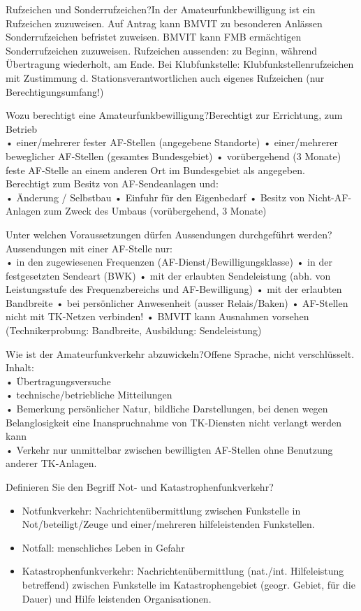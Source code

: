 \documentclass[avery5371,grid,frame,a4paper]{flashcards}
\newcommand{\card}[3]{
  \begin{flashcard}[{\chap} -- #1]{#2}#3\end{flashcard}
}
\begin{document}
\card{29}{Rufzeichen und Sonderrufzeichen?}{In der Amateurfunkbewilligung ist ein Rufzeichen zuzuweisen. Auf Antrag kann BMVIT zu besonderen Anlässen Sonderrufzeichen befristet zuweisen. BMVIT kann FMB ermächtigen Sonderrufzeichen zuzuweisen. Rufzeichen aussenden: zu Beginn, während Übertragung wiederholt, am Ende. Bei Klubfunkstelle: Klubfunkstellenrufzeichen mit Zustimmung d. Stationsverantwortlichen auch eigenes Rufzeichen (nur Berechtigungsumfang!)}

\card{30}{Wozu berechtigt eine Amateurfunkbewilligung?}{Berechtigt zur Errichtung, zum Betrieb \\
• einer/mehrerer fester AF-Stellen (angegebene Standorte)
• einer/mehrerer beweglicher AF-Stellen (gesamtes Bundesgebiet)
• vorübergehend (3 Monate) feste AF-Stelle an einem anderen Ort im Bundesgebiet als angegeben. \\
Berechtigt zum Besitz von AF-Sendeanlagen und: \\
• Änderung / Selbstbau
• Einfuhr für den Eigenbedarf
• Besitz von Nicht-AF-Anlagen zum Zweck des Umbaus (vorübergehend, 3 Monate)}

\card{31}{Unter welchen Voraussetzungen dürfen Aussendungen durchgeführt werden?}{Aussendungen mit einer AF-Stelle nur: \\
• in den zugewiesenen Frequenzen (AF-Dienst/Bewilligungsklasse)
• in der festgesetzten Sendeart (BWK)
• mit der erlaubten Sendeleistung (abh. von Leistungsstufe des Frequenzbereichs und AF-Bewilligung)
• mit der erlaubten Bandbreite
• bei persönlicher Anwesenheit (ausser Relais/Baken)
• AF-Stellen nicht mit TK-Netzen verbinden!
• BMVIT kann Ausnahmen vorsehen (Technikerprobung: Bandbreite, Ausbildung: Sendeleistung)}

\card{32}{Wie ist der Amateurfunkverkehr abzuwickeln?}{Offene Sprache, nicht verschlüsselt.
Inhalt:\\ • Übertragungsversuche \\ • technische/betriebliche Mitteilungen \\ • Bemerkung persönlicher Natur, bildliche Darstellungen, bei denen wegen Belanglosigkeit eine Inanspruchnahme von TK-Diensten nicht verlangt werden kann \\ • Verkehr nur unmittelbar zwischen bewilligten AF-Stellen ohne Benutzung anderer TK-Anlagen.}

\card{33}{Definieren Sie den Begriff Not- und Katastrophenfunkverkehr?}{\begin{itemize}\itemsep0pt \item Notfunkverkehr: Nachrichtenübermittlung zwischen Funkstelle in Not/beteiligt/Zeuge und einer/mehreren hilfeleistenden Funkstellen. \item Notfall: menschliches Leben in Gefahr \item Katastrophenfunkverkehr: Nachrichtenübermittlung (nat./int. Hilfeleistung betreffend) zwischen Funkstelle im Katastrophengebiet (geogr. Gebiet, für die Dauer) und Hilfe
leistenden Organisationen.\end{itemize}}
\end{document}
